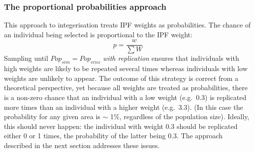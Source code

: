 
\subsubsection{The proportional probabilities approach}
This approach to integerisation treats IPF weights as probabilities.
The chance of an individual being selected is proportional to the IPF
weight:
\begin{equation}
 p = \frac{w}{\sum{W}}
\end{equation}
Sampling until $Pop_{sim} = Pop_{cens}$ \emph{with replication} ensures that
individuals with high weights are likely to be repeated several times
whereas individuals with low weights are unlikely to appear.
The outcome of this strategy is correct from a theoretical perspective,
yet because all weights are treated as
probabilities, there is a non-zero
chance that an individual with a low weight
(e.g.~0.3) is replicated
more times than an individual with a higher weight (e.g.~3.3). (In this
case the probability for any given area is $\sim$ 1\%, regardless of the
population size). Ideally, this should never happen: the individual with weight
0.3 should be replicated either 0 or 1 times, the probability of the latter
being 0.3. The approach described in the next section addresses these issues.

